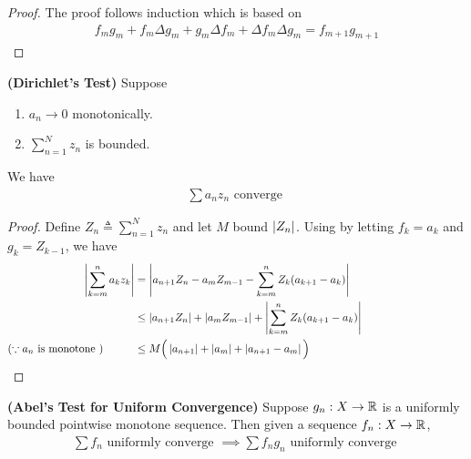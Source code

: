 \documentclass{report}
\begin{document}
\begin{proof}
The proof follows induction which is based on 
\begin{align*}
f_mg_m+ f_m\Delta g_m+ g_m \Delta f_m +\Delta f_m \Delta g_m=f_{m+1}g_{m+1}
\end{align*} 
\end{proof}
\begin{theorem}
\label{Dirichlet's Test}
\textbf{(Dirichlet's Test)} Suppose 
\begin{enumerate}[label=(\alph*)]
  \item $a_n\to 0$ monotonically. 
  \item $\sum_{n=1}^N z_n$ is bounded.
\end{enumerate}
We have 
\begin{align*}
\sum a_nz_n\text{ converge }
\end{align*}
\end{theorem}
\begin{proof}
Define $Z_n\triangleq \sum_{n=1}^N z_n$ and let $M$ bound  $\left|Z_n\right|$. Using  by letting $f_k=a_k$ and $g_k=Z_{k-1}$, we have
\begin{align*}
  \abso{\sum_{k=m}^{n}a_kz_k}&= \abso{a_{n+1}Z_n- a_mZ_{m-1}- \sum_{k=m}^n Z_k(a_{k+1}-a_k)}\\
                             &\leq \abso{a_{n+1}Z_n}+ \abso{a_mZ_{m-1}}+ \abso{\sum_{k=m}^n Z_k (a_{k+1}-a_k)}\\
  (\because a_n\text{ is monotone })\hspace{1cm}&\leq M\Big(\abso{a_{n+1}}+\abso{a_{m}}+\abso{a_{n+1}-a_m} \Big)\hspace{5cm}
\end{align*}
\end{proof}
\begin{theorem}
\label{Abel's Test for Uniform Convergence}
\textbf{(Abel's Test for Uniform Convergence)} Suppose $g_n:X\rightarrow \mathbb{R}$ is a uniformly bounded pointwise monotone sequence. Then given a sequence $f_n:X\rightarrow \mathbb{R}$, 
\begin{align*}
\sum f_n\text{ uniformly converge }\implies \sum f_ng_n\text{ uniformly converge }
\end{align*}
\end{theorem}
\end{document}
